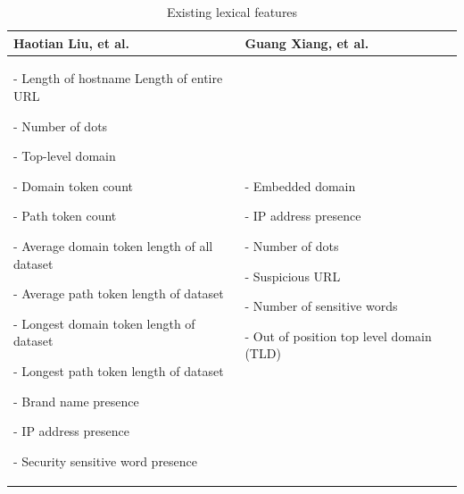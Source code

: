 \begin{table}
\centering{}%
\begin{tabular}{|>{\raggedright}p{5cm}|>{\raggedright}p{3.5cm}|}
\hline 
\textbf{\scriptsize{}Haotian Liu, et al. \citep{liu}} & \textbf{\scriptsize{}Guang Xiang, et al. \citep{xiang:2011}}\tabularnewline
\hline 
\hline 
{\scriptsize{}- Length of hostname Length of entire URL}{\scriptsize \par}

{\scriptsize{}- Number of dots }{\scriptsize \par}

{\scriptsize{}- Top-level domain}{\scriptsize \par}

{\scriptsize{}- Domain token count}{\scriptsize \par}

{\scriptsize{}- Path token count}{\scriptsize \par}

{\scriptsize{}- Average domain token length of all dataset}{\scriptsize \par}

{\scriptsize{}- Average path token length of dataset}{\scriptsize \par}

{\scriptsize{}- Longest domain token length of dataset}{\scriptsize \par}

{\scriptsize{}- Longest path token length of dataset}{\scriptsize \par}

{\scriptsize{}- Brand name presence }{\scriptsize \par}

{\scriptsize{}- IP address presence}{\scriptsize \par}

{\scriptsize{}- Security sensitive word presence } & {\scriptsize{}- Embedded domain}{\scriptsize \par}

{\scriptsize{}- IP address presence}{\scriptsize \par}

{\scriptsize{}- Number of dots}{\scriptsize \par}

{\scriptsize{}- Suspicious URL }{\scriptsize \par}

{\scriptsize{}- Number of sensitive words}{\scriptsize \par}

{\scriptsize{}- Out of position top level domain (TLD) }\tabularnewline
\hline 
\end{tabular}\protect\caption{\label{tab:exist-lex}Existing lexical features \citep{liu,xiang:2011}}
\end{table}

